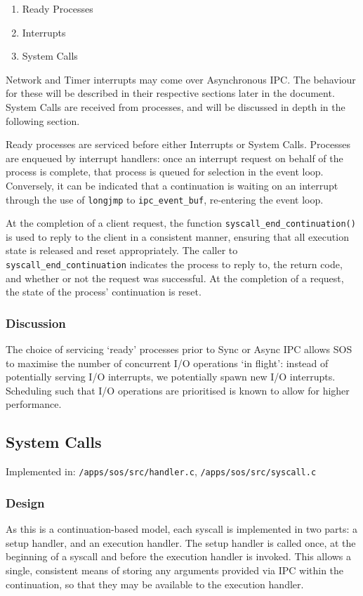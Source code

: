 \documentclass[a4paper,12pt]{article}
\begin{document}
\begin{enumerate}
\item Ready Processes
\item Interrupts
\item System Calls
\end{enumerate}

Network and Timer interrupts may come over Asynchronous IPC.  The behaviour
for these will be described in their respective sections later in the
document.  System Calls are received from processes, and will be discussed in
depth in the following section.

Ready processes are serviced before either Interrupts or System Calls.
Processes are enqueued by interrupt handlers: once an interrupt request on
behalf of the process is complete, that process is queued for selection in the
event loop.  Conversely, it can be indicated that a continuation is waiting on
an interrupt through the use of \texttt{longjmp} to \texttt{ipc\_event\_buf},
re-entering the event loop.

At the completion of a client request, the function
\texttt{syscall\_end\_continuation()} is used to reply to the client in a
consistent manner, ensuring that all execution state is released and reset
appropriately.  The caller to \texttt{syscall\_end\_continuation} indicates
the process to reply to, the return code, and whether or not the request was
successful.  At the completion of a request, the state of the process'
continuation is reset.

\subsubsection{Discussion}
The choice of servicing `ready' processes prior to Sync or Async IPC allows
SOS to maximise the number of concurrent I/O operations `in flight': instead
of potentially serving I/O interrupts, we potentially spawn new I/O
interrupts.  Scheduling such that I/O operations are prioritised is known to
allow for higher performance.

\subsection{System Calls}
Implemented in: \texttt{/apps/sos/src/handler.c}, \texttt{/apps/sos/src/syscall.c}

\subsubsection{Design}
As this is a continuation-based model, each syscall is implemented in two
parts: a setup handler, and an execution handler.  The setup handler is called
once, at the beginning of a syscall and before the execution handler is
invoked.  This allows a single, consistent means of storing any arguments
provided via IPC within the continuation, so that they may be available to the
execution handler.
\end{document}
